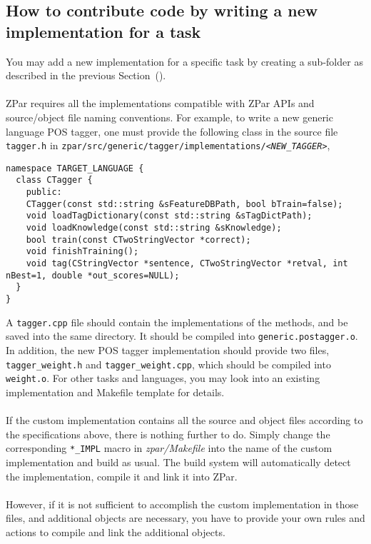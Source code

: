 \documentclass[12pt]{article}
\begin{document}
\begin{CJK}{GBK}{song}
\section{How to contribute code by writing a new implementation for a task}
\label{sec:customizing-zpar}

You may add a new implementation for a specific task
by creating a sub-folder as described in the previous Section~().
\\
\\
ZPar requires all the implementations compatible with
ZPar APIs and source/object file naming conventions.
For example, to write a new generic language POS tagger,
one must provide
the following class in the source file \texttt{tagger.h}
in \texttt{zpar/src/generic/tagger/implementations/\textit{<NEW\_TAGGER>}},
\begin{verbatim}
namespace TARGET_LANGUAGE {
  class CTagger {
    public:
    CTagger(const std::string &sFeatureDBPath, bool bTrain=false);
    void loadTagDictionary(const std::string &sTagDictPath);
    void loadKnowledge(const std::string &sKnowledge);
    bool train(const CTwoStringVector *correct);
    void finishTraining();
    void tag(CStringVector *sentence, CTwoStringVector *retval, int nBest=1, double *out_scores=NULL);
  }
}
\end{verbatim}
A \texttt{tagger.cpp} file should contain the implementations 
of the methods,
and be saved into the same directory.
It should be compiled into \texttt{generic.postagger.o}.
In addition, the new POS tagger implementation should provide two files, 
\texttt{tagger\_weight.h} and \texttt{tagger\_weight.cpp}, 
which should be compiled into \texttt{weight.o}.
For other tasks and languages, you may look into an existing implementation
and Makefile template for details.
\\
\\
If the custom implementation contains all the
source and object files according to the specifications above,
there is nothing further to do.
Simply change the corresponding \texttt{*\_IMPL} macro in \textit{zpar/Makefile}
into the name of the custom implementation and build as usual.
The build system will automatically detect the implementation,
compile it and link it into ZPar.
\\
\\
However, if it is not sufficient to accomplish
the custom implementation in those files,
and additional objects are necessary,
you have to provide your own rules and actions
to compile and link the additional objects.

\end{CJK}
\end{document}
